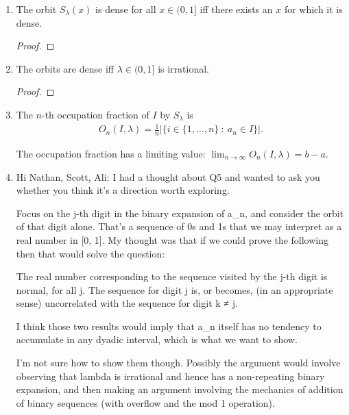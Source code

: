 \begin{enumerate}[label=(5.\arabic*)]

\item
  \begin{claim*}
    The orbit $S_{\lambda}(x)$ is dense for all $x \in (0, 1]$ iff there exists an $x$ for which it is dense.
  \end{claim*}
  \begin{proof}
  \end{proof}

\item
  \begin{claim*}
    The orbits are dense iff $\lambda \in (0, 1]$ is irrational.
  \end{claim*}
  \begin{proof}
  \end{proof}

\item
  \begin{definition*}
    The $n$-th occupation fraction of $I$ by $S_\lambda$ is
    \begin{align*}
      O_n(I, \lambda) = \frac{1}{n}\Big|\Big\{i \in \{1, \ldots, n\} ~:~ a_n \in I\Big\}\Big|.
    \end{align*}
  \end{definition*}
  \begin{claim*}
   The occupation fraction has a limiting value: $\lim_{n\to\infty}O_n(I, \lambda) = b - a$.
  \end{claim*}
\item

Hi Nathan, Scott, Ali: I had a thought about Q5 and wanted to ask you whether you think it's a direction worth exploring.

Focus on the j-th digit in the binary expansion of a_n, and consider the orbit of that digit alone. That's a sequence of 0s and 1s that we may interpret as a real number in [0, 1]. My thought was that if we could prove the following then that would solve the question:

The real number corresponding to the sequence visited by the j-th digit is normal, for all j.
The sequence for digit j is, or becomes, (in an appropriate sense) uncorrelated with the sequence for digit k ≠ j.

I think those two results would imply that a_n itself has no tendency to accumulate in any dyadic interval, which is what we want to show.

I'm not sure how to show them though. Possibly the argument would involve observing that lambda is irrational and hence has a non-repeating binary expansion, and then making an argument involving the mechanics of addition of binary sequences (with overflow and the mod 1 operation).



\end{enumerate}
